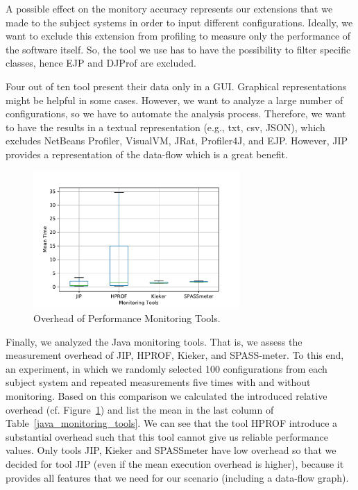 A possible effect on the monitory accuracy represents our extensions that we made to the subject systems in order to input different configurations. Ideally, we want to exclude this extension from profiling to measure only the performance of the software itself. So, the tool we use has to have the possibility to filter specific classes, hence EJP and DJProf are excluded.

Four out of ten tool present their data only in a \ac{GUI}. Graphical representations might be helpful in some cases. However, we want to analyze a large number of configurations, so we have to automate the analysis process. Therefore, we want to have the results in a textual representation (e.g., txt, csv, JSON), which excludes NetBeans Profiler, VisualVM, JRat, Profiler4J, and EJP. However, JIP provides a representation of the data-flow which is a great benefit.


\begin{figure}[h]
  \centering
  \includegraphics[width=0.7\textwidth]{images/porfiling_tools_overhead_only_Prof}
  \caption{Overhead of Performance Monitoring Tools.}
  \label{fig:prof_tools_analysis}
\end{figure}

Finally, we analyzed the Java monitoring tools. That is, we assess the measurement overhead of JIP, HPROF, Kieker, and SPASS-meter. To this end, an experiment, in which we randomly selected 100 configurations from each subject system and repeated measurements five times with and without monitoring. Based on this comparison we calculated the introduced relative overhead (cf. Figure~\ref{fig:prof_tools_analysis}) and list the mean in the last column of Table~\ref{java_monitoring_tools}.
We can see that the tool HPROF introduce a substantial overhead such that this tool cannot give us reliable performance values. Only tools JIP, Kieker and SPASSmeter have low overhead so that we decided for tool JIP (even if the mean execution overhead is higher), because it provides all features that we need for our scenario (including a data-flow graph).

